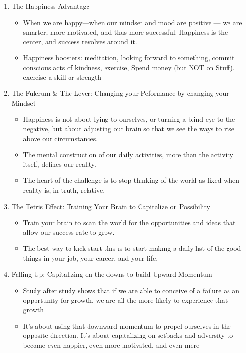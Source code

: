 \documentclass[12pt]{article}
\begin{document}
\begin{enumerate}
\item The Happiness Advantage
  \begin{itemize}
\item When we are happy—when our mindset and mood are positive --- we
  are smarter, more motivated, and thus more successful. Happiness is
  the center, and success revolves around it.
\item Happiness boosters: meditation, looking forward to something,
  commit conscious acts of kindness, exercise, Spend money (but NOT on
  Stuff), exercise a skill or strength
  \end{itemize}
\item The Fulcrum \& The Lever: Changing your Peformance by changing
  your Mindset
  \begin{itemize}
\item Happiness is not about lying to ourselves, or turning a blind
  eye to the negative, but about adjusting our brain so that we see
  the ways to rise above our circumstances.
 \item The mental construction of our daily activities, more than the
   activity itself, defines our reality.
\item The heart of the challenge is to stop thinking of the world as fixed
when reality is, in truth, relative.
  \end{itemize}
\item The Tetris Effect: Training Your Brain to Capitalize on Possibility
\begin{itemize}
\item Train your brain to scan the world for the opportunities and
  ideas that allow our success rate to grow.
\item The best way to kick-start this is to start making a daily list
  of the good things in your job, your career, and your life.
 \end{itemize}
\item Falling Up: Capitalizing on the downs to build Upward Momentum
\begin{itemize}
\item Study after study shows that if we are able to conceive of a
  failure as an opportunity for growth, we are all the more likely to
  experience that growth
\item It’s about using that downward momentum to propel ourselves in
  the opposite direction. It’s about capitalizing on setbacks and
  adversity to become even happier, even more motivated, and even more

\end{itemize}
\end{enumerate}
\end{document}

